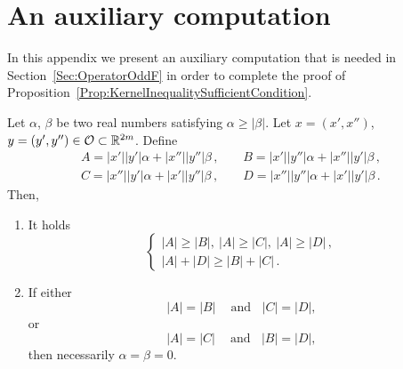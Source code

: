 \section{An auxiliary computation}
\label{Sec:AuxiliaryResults2}

In this appendix we present an auxiliary computation that is needed in Section~\ref{Sec:OperatorOddF} in order to complete the proof of Proposition~\ref{Prop:KernelInequalitySufficientCondition}.

\begin{lemma}
\label{Lemma:ComputationABCD} Let $\alpha$, $\beta$ be two real numbers satisfying $\alpha \geq
|\beta|$. Let $x=(x',x'')$, $y=(y',y'')\in \mathcal{O} \subset \mathbb{R}^{2m}$. Define
$$
\begin{array}{cc}
	A = |x'||y'|  \alpha + |x''||y''|\beta \,, \ \ \ \ \ &
	B = |x'||y''| \alpha + |x''||y'| \beta \,, \\
	C = |x''||y'| \alpha + |x'||y''| \beta \,, \ \ \ \ \ &
	D = |x''||y''|\alpha + |x'||y'|  \beta \,.
\end{array}
$$
Then,
\begin{enumerate}
\item It holds
$$
\begin{cases}
|A| \geq |B|,\ |A| \geq|C|, \ |A| \geq|D|\,, \\
|A| + |D| \geq |B| + |C|\,.
\end{cases}
$$
\item If either
$$ |A| = |B| \ \ \ \ \textrm{ and} \ \ \ \ |C| = |D|, $$
or
$$ |A| = |C| \ \ \ \ \textrm{ and} \ \ \ \ |B| = |D|, $$
then necessarily $\alpha = \beta = 0$.
\end{enumerate}

\end{lemma}
